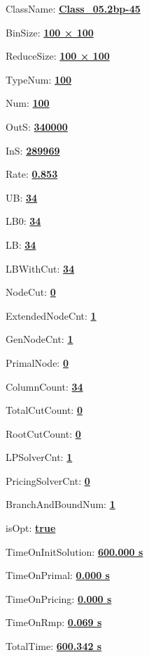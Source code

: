 \documentclass[11pt]{article}
\begin{document}
\pagestyle{empty}


ClassName: \underline{\textbf{Class_05.2bp-45}}
\par
BinSize: \underline{\textbf{100 × 100}}
\par
ReduceSize: \underline{\textbf{100 × 100}}
\par
TypeNum: \underline{\textbf{100}}
\par
Num: \underline{\textbf{100}}
\par
OutS: \underline{\textbf{340000}}
\par
InS: \underline{\textbf{289969}}
\par
Rate: \underline{\textbf{0.853}}
\par
UB: \underline{\textbf{34}}
\par
LB0: \underline{\textbf{34}}
\par
LB: \underline{\textbf{34}}
\par
LBWithCut: \underline{\textbf{34}}
\par
NodeCut: \underline{\textbf{0}}
\par
ExtendedNodeCnt: \underline{\textbf{1}}
\par
GenNodeCnt: \underline{\textbf{1}}
\par
PrimalNode: \underline{\textbf{0}}
\par
ColumnCount: \underline{\textbf{34}}
\par
TotalCutCount: \underline{\textbf{0}}
\par
RootCutCount: \underline{\textbf{0}}
\par
LPSolverCnt: \underline{\textbf{1}}
\par
PricingSolverCnt: \underline{\textbf{0}}
\par
BranchAndBoundNum: \underline{\textbf{1}}
\par
isOpt: \underline{\textbf{true}}
\par
TimeOnInitSolution: \underline{\textbf{600.000 s}}
\par
TimeOnPrimal: \underline{\textbf{0.000 s}}
\par
TimeOnPricing: \underline{\textbf{0.000 s}}
\par
TimeOnRmp: \underline{\textbf{0.069 s}}
\par
TotalTime: \underline{\textbf{600.342 s}}
\par
\newpage


\end{document}
